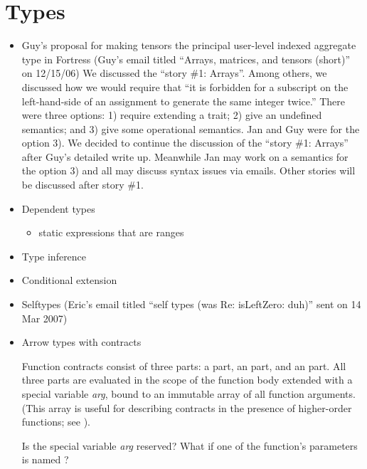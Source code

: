 \section{Types}
\begin{itemize}
\item Guy's proposal for making tensors the principal user-level indexed aggregate type in Fortress
(Guy's email titled ``Arrays, matrices, and tensors (short)'' on 12/15/06)
We discussed the ``story \#1: Arrays''.  Among others,
we discussed how we would require that ``it is forbidden for a subscript on the left-hand-side of an assignment to generate the same integer twice.''
There were three options: 1) require extending a  trait;
2) give an undefined semantics; and 3) give some operational semantics.
Jan and Guy were for the option 3).
We decided to continue the discussion of the ``story \#1: Arrays'' after Guy's detailed write up.
Meanwhile Jan may work on a semantics for the option 3) and all may discuss syntax issues via emails.  Other stories will be discussed after story \#1.


\item Dependent types
  \begin{itemize}
  \item static expressions that are ranges
  \end{itemize}
\item Type inference
\item Conditional extension
\item Selftypes (Eric's email titled ``self types (was Re: isLeftZero: duh)'' sent on 14 Mar 2007)
\item Arrow types with contracts

Function contracts consist of three parts: a  part,
an  part, and an  part.
All three parts are evaluated in the scope of the function body
extended with a special variable \emph{arg}, bound to an immutable
array of all function arguments. (This array is useful for describing
contracts in the presence of higher-order functions;
see ).

Is the special variable \emph{arg} reserved?
What if one of the function's parameters is named ?


\end{itemize}
